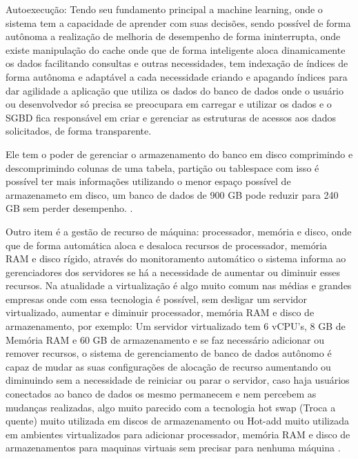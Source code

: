 \begin{alineas}
	\item Autoexecução: Tendo seu fundamento principal a machine learning, onde o sistema tem a capacidade de aprender com suas decisões, sendo possível de forma autônoma a realização de melhoria de desempenho de forma ininterrupta, onde existe manipulação do cache onde que de forma inteligente aloca dinamicamente os dados facilitando consultas e outras necessidades, tem indexação de índices de forma autônoma e adaptável a cada necessidade criando e apagando índices para dar agilidade a aplicação que utiliza os dados do banco de dados onde o usuário ou desenvolvedor só precisa se preocupara em carregar e utilizar os dados e o SGBD fica responsável em criar e gerenciar as estruturas de acessos aos dados solicitados, de forma transparente.
	
	 Ele tem o poder de gerenciar o armazenamento do banco em disco comprimindo e descomprimindo colunas de uma tabela, partição ou tablespace com isso é possível ter mais informações utilizando o menor espaço possível de armazenameto em disco, um banco de dados de 900 GB pode reduzir para 240 GB sem perder desempenho. \cite{OracleExadata}.
	 
	 Outro item é a gestão de recurso de máquina: processador, memória e disco, onde que de forma automática aloca e desaloca recursos de processador, memória RAM e disco rígido, através do monitoramento automático o sistema informa ao gerenciadores dos servidores se há a necessidade de aumentar ou diminuir esses recursos. Na atualidade a virtualização é algo muito comum nas médias e grandes empresas onde com essa tecnologia é possível, sem desligar um servidor virtualizado, aumentar e diminuir processador, memória RAM e disco de armazenamento, por exemplo: Um servidor virtualizado tem 6 vCPU’s, 8 GB de Memória RAM e 60 GB de armazenamento e se faz necessário adicionar ou remover recursos, o sistema de gerenciamento de banco de dados autônomo é capaz de mudar as suas configurações de alocação de recurso aumentando ou diminuindo sem a necessidade de reiniciar ou parar o servidor, caso haja usuários conectados ao banco de dados os mesmo permanecem e nem percebem as mudanças realizadas, algo muito parecido com a tecnologia hot swap (Troca a quente) muito utilizada em discos de armazenamento ou Hot-add muito utilizada em ambientes virtualizados para adicionar processador, memória RAM e disco de armazenamentos para maquinas virtuais sem precisar para nenhuma máquina \cite{OracleBreakingFree}.
	

\end{alineas}
